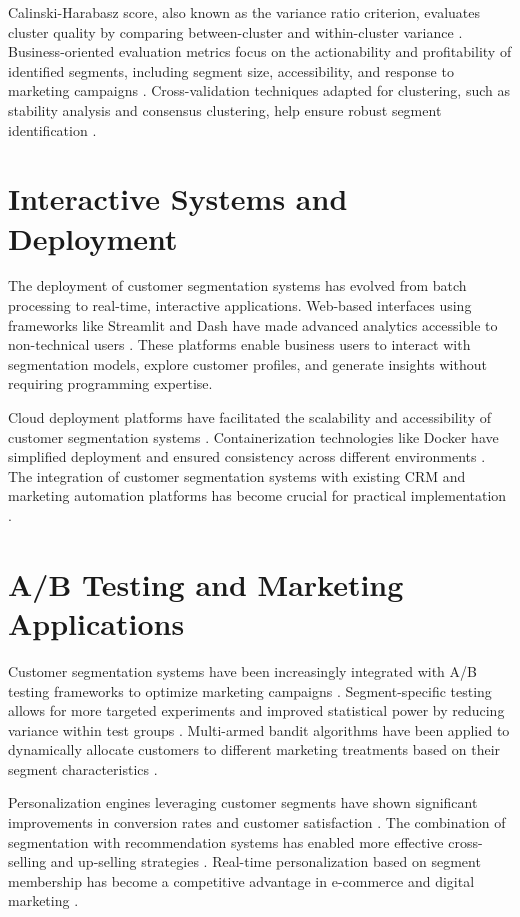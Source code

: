 \documentclass[12pt,a4paper]{report}
\begin{document}
\noindent
Calinski-Harabasz score, also known as the variance ratio criterion, evaluates cluster quality by comparing between-cluster and within-cluster variance \cite{calinski1974}. Business-oriented evaluation metrics focus on the actionability and profitability of identified segments, including segment size, accessibility, and response to marketing campaigns \cite{wedel2000market}. Cross-validation techniques adapted for clustering, such as stability analysis and consensus clustering, help ensure robust segment identification \cite{monti2003}.

\section{Interactive Systems and Deployment}
The deployment of customer segmentation systems has evolved from batch processing to real-time, interactive applications. Web-based interfaces using frameworks like Streamlit and Dash have made advanced analytics accessible to non-technical users \cite{streamlit2019}. These platforms enable business users to interact with segmentation models, explore customer profiles, and generate insights without requiring programming expertise.

\noindent
Cloud deployment platforms have facilitated the scalability and accessibility of customer segmentation systems \cite{armbrust2010}. Containerization technologies like Docker have simplified deployment and ensured consistency across different environments \cite{merkel2014}. The integration of customer segmentation systems with existing CRM and marketing automation platforms has become crucial for practical implementation \cite{payne2005}.


\section{A/B Testing and Marketing Applications}
Customer segmentation systems have been increasingly integrated with A/B testing frameworks to optimize marketing campaigns \cite{kohavi2009}. Segment-specific testing allows for more targeted experiments and improved statistical power by reducing variance within test groups \cite{deng2013}. Multi-armed bandit algorithms have been applied to dynamically allocate customers to different marketing treatments based on their segment characteristics \cite{scott2010}.

\noindent
Personalization engines leveraging customer segments have shown significant improvements in conversion rates and customer satisfaction \cite{montgomery2004}. The combination of segmentation with recommendation systems has enabled more effective cross-selling and up-selling strategies \cite{schafer2007}. Real-time personalization based on segment membership has become a competitive advantage in e-commerce and digital marketing \cite{ansari2000}.
\end{document}
